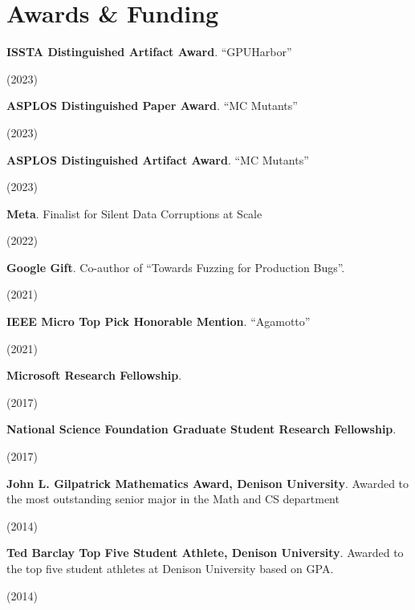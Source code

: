 \documentclass[letterpaper,10pt]{article}
\newcommand{\sidebyside}[2]{
  \begin{minipage}[t]{.75\textwidth}
    \raggedright{}
    #2
  \end{minipage}
  \hspace{.01\textwidth}
    \begin{minipage}[t]{.205\textwidth}
    \raggedleft
    #1
  \end{minipage}
}
\newcommand{\trio}[3]{\sidebyside{#3}{\textbf{#1}. #2}}
\begin{document}
\section{Awards \& Funding}
\begin{smenumerate}
\item \trio{ISSTA Distinguished Artifact Award}{``GPUHarbor''}{(2023)}
\item \trio{ASPLOS Distinguished Paper Award}{``MC Mutants''}{(2023)}
\item \trio{ASPLOS Distinguished Artifact Award}{``MC Mutants''}{(2023)}
\item \trio{Meta}{Finalist for Silent Data Corruptions at Scale}{(2022)}
\item \trio{Google Gift}{Co-author of ``Towards Fuzzing for Production Bugs''.}{(2021)}
\item \trio{IEEE Micro Top Pick Honorable Mention}{``Agamotto''}{(2021)}
\item \trio{Microsoft Research Fellowship}{}{(2017)}
\item \trio{National Science Foundation Graduate Student Research
  Fellowship}{}{(2017)}
\item \trio{John L. Gilpatrick Mathematics Award, Denison University}{Awarded to
  the most outstanding senior major in the Math and CS department}{(2014)}
\item \trio{Ted Barclay Top Five Student Athlete, Denison University}{Awarded to
  the top five student athletes at Denison University based on GPA.}{(2014)}
\end{smenumerate}


\end{document}
